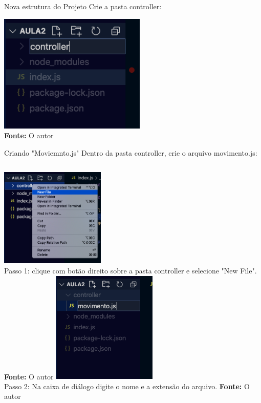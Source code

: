\documentclass{beamer}
\begin{document}
    \begin{frame}[label=lists]{Nova estrutura do Projeto }
    Crie a pasta controller:\\
    \begin{center}
    	\includegraphics[width=70mm]{resources/aula4_2.png}\\
        \tiny{\textbf{Fonte:} O autor}
     \end{center}
    \end{frame}
    \begin{frame}[label=lists]{Criando "Moviemnto.js" }
    Dentro da pasta controller, crie o arquivo movimento.js:\\

   \begin{columns}[onlytextwidth]
    		\includegraphics[width=50mm]{resources/aula4_3.png}\\
        		\tiny{Passo 1: clique com botão direito sobre a pasta controller e selecione "New File". \textbf{Fonte:} O autor}
        		\includegraphics[width=50mm]{resources/aula4_4.png}\\
        		\tiny{Passo 2: Na caixa de diálogo digite o nome e a extensão do arquivo. \textbf{Fonte:} O autor}
       \end{columns}
    \end{frame}
\end{document}
